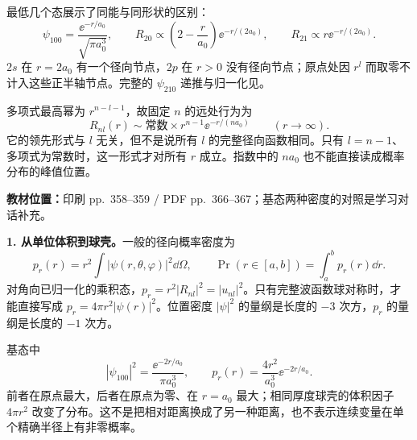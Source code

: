 最低几个态展示了同能与同形状的区别：
\begin{equation}
  \psi_{100}=\frac{\ee^{-r/a_0}}{\sqrt{\pi a_0^3}},\qquad
  R_{20}\propto\left(2-\frac r{a_0}\right)\ee^{-r/(2a_0)},\qquad
  R_{21}\propto r\ee^{-r/(2a_0)}.
\end{equation}
$2s$ 在 $r=2a_0$ 有一个径向节点，$2p$ 在 $r>0$ 没有径向节点；原点处因 $r^l$ 而取零不计入这些正半轴节点。完整的 $\psi_{210}$ 递推与归一化见。

多项式最高幂为 $r^{n-l-1}$，故固定 $n$ 的远处行为为
\begin{equation}
  \boxed{R_{nl}(r)\sim\text{常数}\times r^{n-1}\ee^{-r/(na_0)}
    \qquad(r\to\infty).}
\end{equation}
它的领先形式与 $l$ 无关，但不是说所有 $l$ 的完整径向函数相同。只有 $l=n-1$、多项式为常数时，这一形式才对所有 $r$ 成立。指数中的 $na_0$ 也不能直接读成概率分布的峰值位置。

\textbf{教材位置：}印刷 pp.~358--359 / PDF pp.~366--367；基态两种密度的对照是学习对话补充。

\textbf{1. 从单位体积到球壳。}一般的径向概率密度为
\begin{equation}
  \boxed{p_r(r)=r^2\int|\psi(r,\theta,\varphi)|^2\dd\Omega,
    \qquad \Pr(r\in[a,b])=\int_a^b p_r(r)\dd r.}
\end{equation}
对角向已归一化的乘积态，$p_r=r^2|R_{nl}|^2=|u_{nl}|^2$。只有完整波函数球对称时，才能直接写成 $p_r=4\pi r^2|\psi(r)|^2$。位置密度 $|\psi|^2$ 的量纲是长度的 $-3$ 次方，$p_r$ 的量纲是长度的 $-1$ 次方。

基态中
\begin{equation}
  |\psi_{100}|^2=\frac{\ee^{-2r/a_0}}{\pi a_0^3},\qquad
  p_r(r)=\frac{4r^2}{a_0^3}\ee^{-2r/a_0}.
\end{equation}
前者在原点最大，后者在原点为零、在 $r=a_0$ 最大；相同厚度球壳的体积因子 $4\pi r^2$ 改变了分布。这不是把相对距离换成了另一种距离，也不表示连续变量在单个精确半径上有非零概率。

